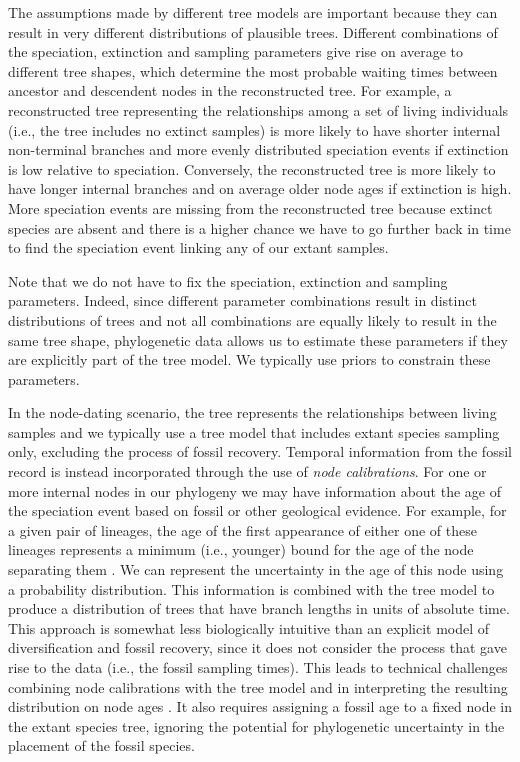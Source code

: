 The assumptions made by different tree models are important because they can result in very different distributions of plausible trees.
Different combinations of the speciation, extinction and sampling parameters give rise on average to different tree shapes, which determine the most probable waiting times between ancestor and descendent nodes
in the reconstructed tree.
For example, a reconstructed tree representing the relationships among a set of living individuals (i.e., the tree includes no extinct samples) is more likely to have shorter internal non-terminal branches and more evenly distributed speciation events if extinction is low relative to speciation.
Conversely, the reconstructed tree is more likely to have longer internal branches and on average older node ages if extinction is high.
More speciation events are missing from the reconstructed tree because extinct species are absent and there is a higher chance we have to go further back in time to find the speciation event linking any of our extant samples.

Note that we do not have to fix the speciation, extinction and sampling parameters.
Indeed, since different parameter combinations result in distinct distributions of trees and not all combinations are equally likely to result in the same tree shape, phylogenetic data  allows us to estimate these parameters if they are explicitly part of the tree model.
We typically use priors to constrain these parameters.

In the node-dating scenario, the tree represents the relationships between living samples and we typically use a tree model that includes extant species sampling only, excluding the process of fossil recovery.
Temporal information from the fossil record is instead incorporated through the use of \textit{node calibrations}.
For one or more internal nodes in our phylogeny we may have information about the age of the speciation event based on fossil or other geological evidence.
For example, for a given pair of lineages, the age of the first appearance of either one of these lineages represents a minimum (i.e., younger) bound for the age of the node separating them \citep{Parham2012}.
We can represent the uncertainty in the age of this node using a probability distribution. %
This information is combined with the tree model to produce a distribution of trees that have branch lengths in units of absolute time.
This approach is somewhat less biologically intuitive than an explicit model of diversification and fossil recovery, since it does not consider the process that gave rise to the data (i.e., the fossil sampling times).
This leads to technical challenges combining node calibrations with the tree model and in interpreting the resulting distribution on node ages \citep{Heled2012,Warnock2015}.
It also requires assigning a fossil age to a fixed node in the extant species tree, ignoring the potential for phylogenetic uncertainty in the placement of the fossil species.


